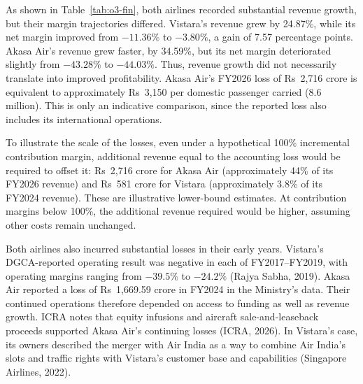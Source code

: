 \documentclass[12pt,a4paper]{article}
\newenvironment{o3box}{\ifthenelse{\boolean{o3highlight}}{\begingroup\color{o3sky}}{}}{\ifthenelse{\boolean{o3highlight}}{\endgroup}{}}
\begin{document}
\begin{o3box}
As shown in Table~\ref{tab:o3-fin}, both airlines recorded substantial revenue growth, but their margin trajectories differed. Vistara's revenue grew by 24.87\%, while its net margin improved from $-11.36\%$ to $-3.80\%$, a gain of 7.57 percentage points. Akasa Air's revenue grew faster, by 34.59\%, but its net margin deteriorated slightly from $-43.28\%$ to $-44.03\%$. Thus, revenue growth did not necessarily translate into improved profitability. Akasa Air's FY2026 loss of Rs~2,716 crore is equivalent to approximately Rs~3,150 per domestic passenger carried (8.6 million). This is only an indicative comparison, since the reported loss also includes its international operations.

To illustrate the scale of the losses, even under a hypothetical 100\% incremental contribution margin, additional revenue equal to the accounting loss would be required to offset it: Rs~2,716 crore for Akasa Air (approximately 44\% of its FY2026 revenue) and Rs~581 crore for Vistara (approximately 3.8\% of its FY2024 revenue). These are illustrative lower-bound estimates. At contribution margins below 100\%, the additional revenue required would be higher, assuming other costs remain unchanged.

Both airlines also incurred substantial losses in their early years. Vistara's DGCA-reported operating result was negative in each of FY2017--FY2019, with operating margins ranging from $-39.5\%$ to $-24.2\%$ (Rajya Sabha, 2019). Akasa Air reported a loss of Rs~1,669.59 crore in FY2024 in the Ministry's data. Their continued operations therefore depended on access to funding as well as revenue growth. ICRA notes that equity infusions and aircraft sale-and-leaseback proceeds supported Akasa Air's continuing losses (ICRA, 2026). In Vistara's case, its owners described the merger with Air India as a way to combine Air India's slots and traffic rights with Vistara's customer base and capabilities (Singapore Airlines, 2022).


\end{o3box}
\end{document}
